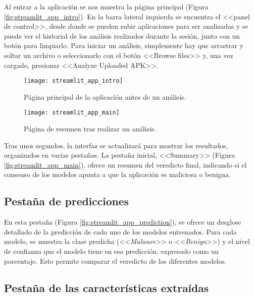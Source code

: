 Al entrar a la aplicación se nos muestra la página principal (Figura \ref{fig:streamlit_app_intro}). En la barra lateral izquierda se encuentra el <<panel de control>>, desde donde se pueden subir aplicaciones para ser analizadas y se puede ver el historial de los análisis realizados durante la sesión, junto con un botón para limpiarlo. Para iniciar un análisis, simplemente hay que arrastrar y soltar un archivo o seleccionarlo con el botón <<Browse files>> y, una vez cargado, presionar <<Analyze Uploaded APK>>.

\begin{figure}[h!]
	\centering
	\begin{minipage}[t]{0.45\textwidth}
		\centering
		\texttt{[image: streamlit\_app\_intro]}
		\caption{Página principal de la aplicación antes de un análisis.}
	\end{minipage}\hfill
	\begin{minipage}[t]{0.45\textwidth}
		\centering
		\texttt{[image: streamlit\_app\_main]}
		\caption{Página de resumen tras realizar un análisis.}
	\end{minipage}
\end{figure}

Tras unos segundos, la interfaz se actualizará para mostrar los resultados, organizados en varias pestañas. La pestaña inicial, <<Summary>> (Figura \ref{fig:streamlit_app_main}), ofrece un resumen del veredicto final, indicando si el consenso de los modelos apunta a que la aplicación es maliciosa o benigna.

\newpage
\subsection{Pestaña de predicciones}

En esta pestaña (Figura \ref{fig:streamlit_app_prediction}), se ofrece un desglose detallado de la predicción de cada uno de los modelos entrenados. Para cada modelo, se muestra la clase predicha (<<\textit{Malware}>> o <<\textit{Benign}>>) y el nivel de confianza que el modelo tiene en esa predicción, expresado como un porcentaje. Esto permite comparar el veredicto de los diferentes modelos.


\subsection{Pestaña de las características extraídas}

